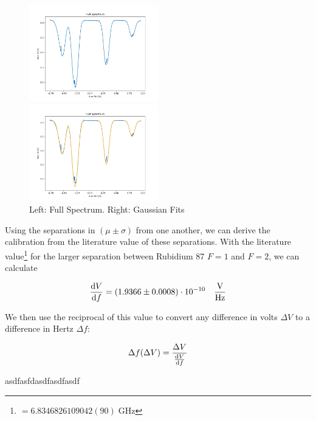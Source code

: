 \documentclass[12pt, a4paper]{article}
\begin{document}
\begin{figure}
    \centering
    \parbox{0.45\textwidth}{
        \includegraphics[width=0.5\textwidth]{fullspectrum.png}
    }
    \hfill
    \parbox{0.45\textwidth}{
        \includegraphics[width=0.5\textwidth]{fullspectrumgaussian}    
    }
    \caption{Left: Full Spectrum. Right: Gaussian Fits}
\end{figure}

Using the separations in $(\mu \pm \sigma)$ from one another, we can derive the calibration from the literature value of these separations. With the literature value\footnote{$= 6.8346826109042(90)\;\si{\giga\hertz}$} for the larger separation between Rubidium 87 $F = 1$ and $F = 2$, we can calculate

\begin{equation}
\dv{V}{f} = (1.9366 \pm 0.0008) \cdot 10^{-10} \quad \si{\frac{\volt}{\hertz}}
\end{equation}

We then use the reciprocal of this value to convert any difference in volts $\Delta V$ to a difference in Hertz $\Delta f$:

\begin{equation}
\Delta f (\Delta V) = \frac{\Delta V}{\dv{V}{f}}
\end{equation}



asdfasfdasdfasdfasdf
\end{document}
